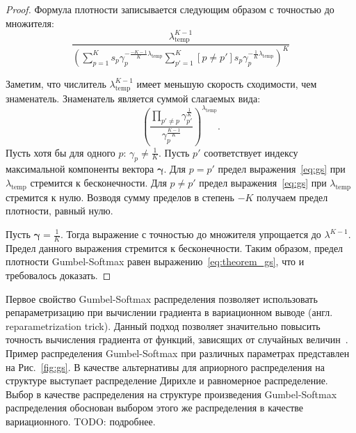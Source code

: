 \begin{proof} 
Формула плотности записывается следующим образом с точностью до множителя:
\[
       \frac{\lambda_{\text{temp}}^{K-1}}{\left(\sum_{p=1}^K s_p\gamma_p^{-\frac{-K-1}{K}\lambda_\text{temp}}\sum_{p'=1}^K [p \neq p']s_p\gamma_p^{-\frac{1}{K}\lambda_\text{temp}}\right)^{K}}
\]


Заметим, что числитель $\lambda_{\text{temp}}^{K-1}$ имеет меньшую скорость сходимости, чем знаменатель. 
Знаменатель является суммой слагаемых вида:
\begin{equation}
\label{eq:gs}
    \left(\frac{\prod_{p' \neq p} \gamma_{p'}^{\frac{1}{K}}}{\gamma_p^{\frac{K-1}{K}}}\right)^{\lambda_{\text{temp}}}.
\end{equation}
Пусть хотя бы для одного $p$: $\gamma_p \neq \frac{1}{K}$. Пусть $p'$ соответствует индексу максимальной компоненты вектора $\boldsymbol{\gamma}$.
Для $p=p'$ предел выражения~\eqref{eq:gs} при $\lambda_{\text{temp}}$ стремится к бесконечности. Для $p\neq p'$ предел выражения~\eqref{eq:gs} при $\lambda_{\text{temp}}$ стремится к нулю. Возводя сумму пределов в степень $-K$ получаем предел плотности, равный нулю.

Пусть $\boldsymbol{\gamma} = \frac{1}{K}$.
Тогда выражение с точностью до множителя упрощается до $\lambda^{K-1}$. Предел данного выражения стремится к бесконечности.
Таким образом, предел плотности Gumbel-Softmax равен выражению~\eqref{eq:theorem_gs}, что и требовалось доказать.

\end{proof}


Первое свойство Gumbel-Softmax распределения позволяет использовать репараметризацию при вычислении градиента в вариационном выводе (англ. reparametrization trick). Данный подход позволяет значительно повысить точность вычисления градиента от функций, зависящих от случайных величин~\cite{reparametrization}.
Пример распределения Gumbel-Softmax при различных параметрах представлен на Рис.~\ref{fig:gs}. В качестве альтернативы для априорного распределения на структуре выступает  распределение Дирихле и равномерное распределение. Выбор в качестве распределения на структуре произведения Gumbel-Softmax распределения обоснован выбором этого же распределения в качестве вариационного. TODO: подробнее.


